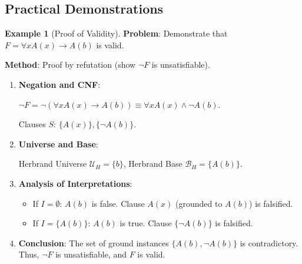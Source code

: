 \documentclass[11pt,a4paper]{article}
\theoremstyle{definition}
\newtheorem{example}{Example}[section]
\theoremstyle{plain}
\theoremstyle{remark}
\begin{document}
\subsection{Practical Demonstrations}



\begin{example}[Proof of Validity]

\textbf{Problem}: Demonstrate that $F = \forall x A(x) \rightarrow A(b)$ is valid.



\textbf{Method}: Proof by refutation (show $\neg F$ is unsatisfiable).



\begin{enumerate}

    \item \textbf{Negation and CNF}:

    $\neg F = \neg (\forall x A(x) \rightarrow A(b)) \equiv \forall x A(x) \wedge \neg A(b)$.

    Clauses $S$: $\{A(x)\}, \{\neg A(b)\}$.

    \item \textbf{Universe and Base}:

    Herbrand Universe $\mathcal{U}_H = \{b\}$, Herbrand Base $\mathcal{B}_H = \{A(b)\}$.

    \item \textbf{Analysis of Interpretations}:

    \begin{itemize}

        \item If $I = \emptyset$: $A(b)$ is false. Clause $A(x)$ (grounded to $A(b)$) is falsified.

        \item If $I = \{A(b)\}$: $A(b)$ is true. Clause $\{\neg A(b)\}$ is falsified.

    \end{itemize}

    \item \textbf{Conclusion}: The set of ground instances $\{A(b), \neg A(b)\}$ is contradictory. Thus, $\neg F$ is unsatisfiable, and $F$ is valid.

\end{enumerate}

\end{example}
\end{document}
